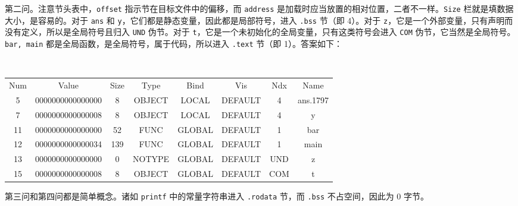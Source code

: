 \begin{problems}
        第二问。注意节头表中，\verb|offset| 指示节在目标文件中的偏移，而 \verb|address| 是加载时应当放置的相对位置，二者不一样。\verb|Size| 栏就是填数据大小，是容易的。对于 \verb|ans| 和 \verb|y|，它们都是静态变量，因此都是局部符号，进入 \verb|.bss| 节（即 4）。对于 \verb|z|，它是一个外部变量，只有声明而没有定义，所以是全局符号且归入 \verb|UND| 伪节。对于 \verb|t|，它是一个未初始化的全局变量，只有这类符号会进入 \verb|COM| 伪节，它当然是全局符号。\verb|bar, main| 都是全局函数，是全局符号，属于代码，所以进入 \verb|.text| 节（即 1）。答案如下：
        \begin{table}[H]
            \tt
            \centering
            \begin{tabular}{cccccccc}
                \hline
                \multicolumn{1}{|c}{Num} & Value & Size & Type & Bind & Vis & Ndx & \multicolumn{1}{c|}{Name} \\
                \multicolumn{1}{|c}{5} & 0000000000000000 & 8 & OBJECT & LOCAL & DEFAULT & 4 & \multicolumn{1}{c|}{ans.1797} \\
                \multicolumn{1}{|c}{7} & 0000000000000008 & 8 & OBJECT & LOCAL & DEFAULT & 4 & \multicolumn{1}{c|}{y} \\
                \multicolumn{1}{|c}{11} & 0000000000000000 & 52 & FUNC & GLOBAL & DEFAULT & 1 & \multicolumn{1}{c|}{bar} \\
                \multicolumn{1}{|c}{12} & 0000000000000034 & 139 & FUNC & GLOBAL & DEFAULT & 1 & \multicolumn{1}{c|}{main} \\
                \multicolumn{1}{|c}{13} & 0000000000000000 & 0 & NOTYPE & GLOBAL & DEFAULT & UND & \multicolumn{1}{c|}{z} \\
                \multicolumn{1}{|c}{15} & 0000000000000008 & 8 & OBJECT & GLOBAL & DEFAULT & COM & \multicolumn{1}{c|}{t} \\ \hline
            \end{tabular}
        \end{table}

        第三问和第四问都是简单概念。诸如 \verb|printf| 中的常量字符串进入 \verb|.rodata| 节，而 \verb|.bss| 不占空间，因此为 0 字节。


\end{problems}
